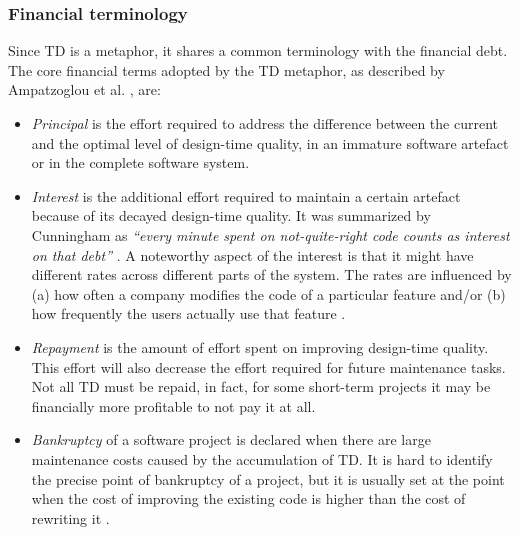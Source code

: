 \subsubsection{Financial terminology}
Since TD is a metaphor, it shares a common terminology with the financial debt.
The core financial terms adopted by the TD metaphor, as described by Ampatzoglou et al. \cite{ampatzoglou_financial_2015}, are:
\begin{itemize}
    \item \textit{Principal} is the effort required to address the difference between the current and the optimal level of design-time quality, in an immature software artefact or in the complete software system.
    \item \textit{Interest} is the additional effort required to maintain a certain artefact because of its decayed design-time quality. It was summarized by Cunningham as \textit{``every minute spent on not-quite-right code counts as interest on that debt''} \cite{Cunningham1992}. A noteworthy aspect of the interest is that it might have different rates across different parts of the system. The rates are influenced by (a) how often a company modifies the code of a particular feature and/or (b) how frequently the users actually use that feature \cite{ries_embradetd_2009,tom_exploration_2016}.
    \item \textit{Repayment} is the amount of effort spent on improving design-time quality. This effort will also decrease the effort required for future maintenance tasks.
    Not all TD must be repaid, in fact, for some short-term projects it may be financially more profitable to not pay it at all.
    \item \textit{Bankruptcy} of a software project is declared when there are large maintenance costs caused by the accumulation of TD. It is hard to identify the precise point of bankruptcy of a project, but it is usually set at the point when the cost of improving the existing code is higher than the cost of rewriting it \cite{elm2009design}.
\end{itemize}

